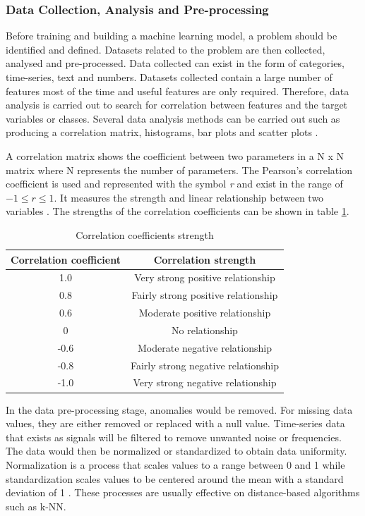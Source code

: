 \subsubsection{Data Collection, Analysis and Pre-processing}
Before training and building a machine learning model, a problem should be identified and defined. Datasets related to the problem are then collected, analysed and pre-processed. Data collected can exist in the form of categories, time-series, text and numbers. Datasets collected contain a large number of features most of the time and useful features are only required. Therefore, data analysis is carried out to search for correlation between features and the target variables or classes. Several data analysis methods can be carried out such as producing a correlation matrix, histograms, bar plots and scatter plots \cite{kashnitsky_2019}.

A correlation matrix shows the coefficient between two parameters in a N x N matrix where N represents the number of parameters. The Pearson's correlation coefficient is used and represented with the symbol \textit{r} and exist in the range of $-1\leq r \leq 1$. It measures the strength and linear relationship between two variables \cite{corr}.  The strengths of the correlation coefficients can be shown in table \ref{table:corr}. 

\begin{table}[h!]
\centering
\begin{center}
\begin{tabular}{ |c|c| } 
 \hline
 Correlation coefficient & Correlation strength\\ 
  \hline\hline
 1.0 & Very strong positive relationship\\ 
 0.8 & Fairly strong positive relationship\\ 
 0.6 & Moderate positive relationship\\ 
 0 & No relationship\\ 
 -0.6 & Moderate negative relationship\\ 
 -0.8 & Fairly strong negative relationship\\ 
 -1.0 & Very strong negative relationship \\ 
  
 \hline
\end{tabular}
\caption{Correlation coefficients strength}
\label{table:corr}
\end{center}
\end{table}
In the data pre-processing stage, anomalies would be removed. For missing data values, they are either removed or replaced with a null value. Time-series data that exists as signals will be filtered to remove unwanted noise or frequencies. The data would then be normalized or standardized to obtain data uniformity. Normalization is a process that scales values to a range between 0 and 1 while standardization scales values to be centered around the mean with a standard deviation of 1 \cite{norm_stand}. These processes are usually effective on distance-based algorithms such as k-NN. 

